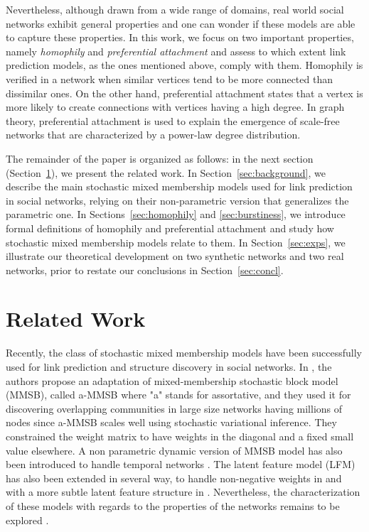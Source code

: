 \documentclass[journal]{IEEEtran}
\begin{document}
Nevertheless, although drawn from a wide range of domains, real world social networks exhibit general properties and one can wonder if these models are able to capture these properties. In this work, we focus on two important properties, namely \textit{homophily} and \textit{preferential attachment} \cite{Newman2010, Barabasi2003} and assess to which extent link prediction models, as the ones mentioned above, comply with them. Homophily is verified in a network when similar vertices tend to be more connected than dissimilar ones. On the other hand, preferential attachment states that a vertex is more likely to create connections with vertices having a high degree. In graph theory, preferential attachment is used to explain the emergence of scale-free networks that are characterized by a power-law degree distribution.

The remainder of the paper is organized as follows: in the next section (Section~\ref{sec:rel-work}), we present the related work. In Section~\ref{sec:background}, we describe the main stochastic mixed membership models used for link prediction in social networks, relying on their non-parametric version that generalizes the parametric one. In Sections~\ref{sec:homophily} and \ref{sec:burstiness}, we introduce formal definitions of homophily and preferential attachment and study how stochastic mixed membership models relate to them. In Section~\ref{sec:exps}, we illustrate our theoretical development on two synthetic networks and two real networks, prior to restate our conclusions in Section~\ref{sec:concl}.

\section{Related Work}
\label{sec:rel-work}

Recently,  the class of stochastic mixed membership models have been successfully used for link prediction and structure discovery in social networks.  In \cite{AMMSB}, the authors  propose an adaptation of mixed-membership stochastic block model (MMSB), called a-MMSB where "a" stands for assortative, and they used it for discovering overlapping communities in large size networks having millions of nodes since a-MMSB  scales well using stochastic variational inference. They constrained the weight matrix to have weights in the diagonal and a fixed small value elsewhere. A non parametric dynamic version of MMSB model has also been introduced to  handle temporal networks \cite{fan2015dynamic}. The latent feature model (LFM) has also been extended in several way, to handle non-negative weights in \cite{IMRM} and with a more subtle latent feature structure in \cite{ILAM}. Nevertheless, the characterization of these models with regards to the properties of the networks remains to be explored \cite{jacobs2014unified}.
\end{document}
